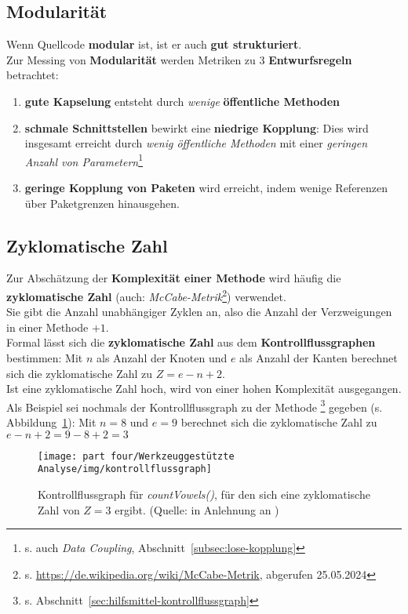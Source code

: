 \subsection*{Modularität}
Wenn Quellcode \textbf{modular} ist, ist er auch \textbf{gut strukturiert}.\\
Zur Messing von \textbf{Modularität} werden Metriken zu 3 \textbf{Entwurfsregeln} betrachtet:

\begin{enumerate}
    \item \textbf{gute Kapselung} entsteht durch \textit{wenige} \textbf{öffentliche Methoden}
    \item \textbf{schmale Schnittstellen} bewirkt eine \textbf{niedrige Kopplung}: Dies wird insgesamt erreicht durch \textit{wenig öffentliche Methoden} mit einer \textit{geringen Anzahl von Parametern}\footnote{
    s. auch \textit{Data Coupling}, Abschnitt~\ref{subsec:lose-kopplung}
    }
    \item \textbf{geringe Kopplung von Paketen} wird erreicht, indem wenige Referenzen über Paketgrenzen hinausgehen.
\end{enumerate}


\subsection*{Zyklomatische Zahl}
Zur Abschätzung der \textbf{Komplexität einer Methode} wird häufig die \textbf{zyklomatische Zahl} (auch: \textit{McCabe-Metrik}\footnote{
s. \url{https://de.wikipedia.org/wiki/McCabe-Metrik}, abgerufen 25.05.2024
}) verwendet.\\
Sie gibt die Anzahl unabhängiger Zyklen an, also die Anzahl der Verzweigungen in einer Methode $+1$.\\
Formal lässt sich die \textbf{zyklomatische Zahl} aus dem \textbf{Kontrollflussgraphen} bestimmen: Mit $n$ als Anzahl der Knoten und $e$ als Anzahl der Kanten berechnet sich die zyklomatische Zahl zu $Z = e - n + 2$.\\
Ist eine zyklomatische Zahl hoch, wird von einer hohen Komplexität ausgegangen.\\
Als Beispiel sei nochmals der Kontrollflussgraph zu der Methode \footnote{
    s. Abschnitt~\ref{sec:hilfsmittel-kontrollflussgraph}
} gegeben (s. Abbildung~\ref{fig:zyklomatischezahl}):  Mit $n = 8$ und $e = 9$ berechnet sich die zyklomatische Zahl zu $e - n + 2 = 9 - 8 + 2 = 3$


\begin{figure}
    \centering
    \texttt{[image: part four/Werkzeuggestützte Analyse/img/kontrollflussgraph]}
    \caption{Kontrollflussgraph für \textit{countVowels()}, für den sich eine zyklomatische Zahl von $Z=3$ ergibt. (Quelle: in Anlehnung an \cite[Abb. 4.1, 32]{Wed09c})}
    \label{fig:zyklomatischezahl}
\end{figure}

